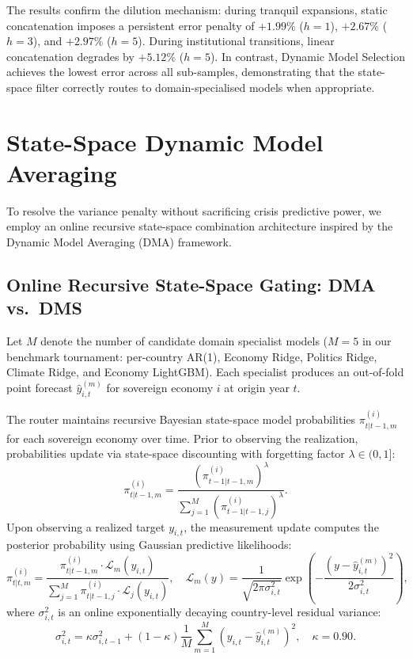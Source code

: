 \documentclass[11pt,a4paper]{article}
\begin{document}

The results confirm the dilution mechanism: during tranquil expansions, static concatenation imposes a persistent error penalty of $+1.99\%$ ($h{=}1$), $+2.67\%$ ($h{=}3$), and $+2.97\%$ ($h{=}5$). During institutional transitions, linear concatenation degrades by $+5.12\%$ ($h{=}5$). In contrast, Dynamic Model Selection achieves the lowest error across all sub-samples, demonstrating that the state-space filter correctly routes to domain-specialised models when appropriate.


\section{State-Space Dynamic Model Averaging}
\label{sec:dms}

To resolve the variance penalty without sacrificing crisis predictive power, we employ an online recursive state-space combination architecture inspired by the \citet{koop2012} Dynamic Model Averaging (DMA) framework.

\subsection{Online Recursive State-Space Gating: DMA vs.\ DMS}

Let $M$ denote the number of candidate domain specialist models ($M=5$ in our benchmark tournament: per-country AR(1), Economy Ridge, Politics Ridge, Climate Ridge, and Economy LightGBM). Each specialist produces an out-of-fold point forecast $\hat{y}_{i,t}^{(m)}$ for sovereign economy $i$ at origin year $t$.

The router maintains recursive Bayesian state-space model probabilities $\pi_{t|t-1, m}^{(i)}$ for each sovereign economy over time. Prior to observing the realization, probabilities update via state-space discounting with forgetting factor $\lambda \in (0, 1]$:
\begin{equation}
\pi_{t|t-1, m}^{(i)} = \frac{(\pi_{t-1|t-1, m}^{(i)})^\lambda}{\sum_{j=1}^M (\pi_{t-1|t-1, j}^{(i)})^\lambda}.
\end{equation}
Upon observing a realized target $y_{i,t}$, the measurement update computes the posterior probability using Gaussian predictive likelihoods:
\begin{equation}
\pi_{t|t, m}^{(i)} = \frac{\pi_{t|t-1, m}^{(i)} \cdot \mathcal{L}_m(y_{i,t})}{\sum_{j=1}^M \pi_{t|t-1, j}^{(i)} \cdot \mathcal{L}_j(y_{i,t})}, \quad \mathcal{L}_m(y) = \frac{1}{\sqrt{2\pi \sigma_{i,t}^2}} \exp\left(-\frac{(y - \hat{y}_{i,t}^{(m)})^2}{2\sigma_{i,t}^2}\right),
\end{equation}
where $\sigma_{i,t}^2$ is an online exponentially decaying country-level residual variance:
\begin{equation}
\sigma_{i,t}^2 = \kappa \sigma_{i,t-1}^2 + (1-\kappa) \frac{1}{M} \sum_{m=1}^M (y_{i,t} - \hat{y}_{i,t}^{(m)})^2, \quad \kappa = 0.90.
\end{equation}
\end{document}
